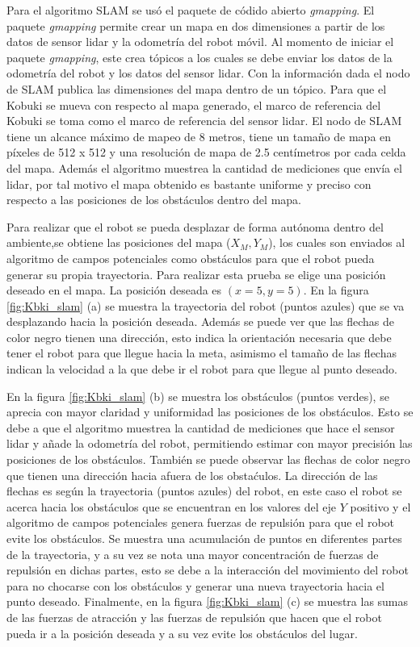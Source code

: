 Para el algoritmo SLAM se usó el paquete de códido abierto \textit{gmapping}. El paquete 
\textit{gmapping} permite crear un mapa en dos dimensiones a partir de los datos de sensor 
lidar y la odometría del robot móvil. Al momento de iniciar el paquete \textit{gmapping}, 
este crea tópicos a los cuales se debe enviar los datos de la odometría del robot y los datos 
del sensor lidar. Con la información dada el nodo de SLAM publica las dimensiones del mapa 
dentro de un tópico. Para que el Kobuki se mueva con respecto al mapa generado, el marco de 
referencia del Kobuki se toma como el marco de referencia del sensor lidar. El nodo de 
SLAM tiene un alcance máximo de mapeo de 8 metros, tiene un tamaño de mapa en píxeles de 
512 x 512 y una resolución de mapa de 2.5 centímetros por cada celda del mapa. Además el 
algoritmo muestrea la cantidad de mediciones que envía el lidar, por tal motivo el mapa 
obtenido es bastante uniforme y preciso con respecto a las posiciones de los obstáculos 
dentro del mapa. 

Para  realizar que el robot se pueda desplazar de forma autónoma dentro del ambiente,se 
obtiene las posiciones del mapa ($X_{M}, Y_{M}$), los cuales son enviados al algoritmo 
de campos potenciales como obstáculos para que el robot pueda generar su propia 
trayectoria. Para realizar esta prueba se elige una posición deseado en el mapa. La 
posición deseada es $(x = 5, y = 5)$. En la figura \ref{fig:Kbki_slam} (a) se muestra 
la trayectoria del robot (puntos azules) que se va desplazando hacia la posición 
deseada. Además se puede ver que las flechas de color negro tienen una dirección, esto
indica la orientación necesaria que debe tener el robot para que llegue hacia la meta, 
asimismo el tamaño de las flechas indican la velocidad a la que debe ir el robot para 
que llegue al punto deseado. 

En la figura \ref{fig:Kbki_slam} (b) se muestra los obstáculos (puntos verdes), se 
aprecia con mayor claridad y uniformidad las posiciones de los obstáculos. Esto se debe 
a que el algoritmo muestrea la cantidad de mediciones que hace el sensor lidar y añade 
la odometría del robot, permitiendo estimar con mayor precisión las posiciones de los 
obstáculos. También se puede observar las flechas de color negro que tienen una dirección 
hacia afuera de los obstaćulos. La dirección de las flechas es según la trayectoria 
(puntos azules) del robot, en este caso el robot se acerca hacia los obstáculos que se 
encuentran en los valores del eje $Y$ positivo y el algoritmo de campos potenciales 
genera fuerzas de repulsión para que el robot evite los obstáculos. Se muestra una 
acumulación de puntos en diferentes partes de la trayectoria, y a su vez se nota una 
mayor concentración de fuerzas de repulsión en dichas partes, esto se debe a la interacción 
del movimiento del robot para no chocarse con los obstáculos y generar una nueva trayectoria 
hacia el punto deseado. Finalmente, en la figura \ref{fig:Kbki_slam} (c) se muestra las sumas 
de las fuerzas de atracción y las fuerzas de repulsión que hacen que el robot pueda ir a la 
posición deseada y a su vez evite los obstáculos del lugar.

